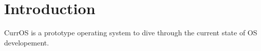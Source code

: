 \section{Introduction}
CurrOS is a prototype operating system to dive through the current state of OS developement.
